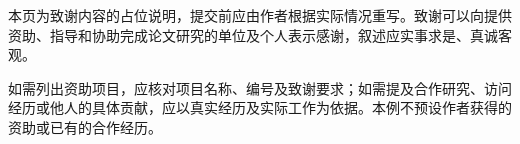 
\begin{acknowledgements}
  本页为致谢内容的占位说明，提交前应由作者根据实际情况重写。致谢可以向提供资助、指导和协助完成论文研究的单位及个人表示感谢，叙述应实事求是、真诚客观。

  如需列出资助项目，应核对项目名称、编号及致谢要求；如需提及合作研究、访问经历或他人的具体贡献，应以真实经历及实际工作为依据。本例不预设作者获得的资助或已有的合作经历。
\end{acknowledgements}
